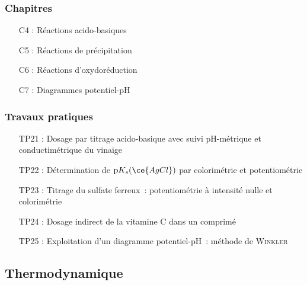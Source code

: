 \documentclass[a4paper, 10pt, final, garamond]{book}
\begin{document}
\begin{multicols}{2}
	\subsubsection{Chapitres}

	\begin{itemize}[label=$\diamond$]
		\item[C4]: Réactions acido-basiques
		\item[C5]: Réactions de précipitation
		\item[C6]: Réactions d'oxydoréduction
		\item[C7]: Diagrammes potentiel-pH
	\end{itemize}

	\columnbreak

	\subsubsection{Travaux pratiques}

	\begin{itemize}[label=$\diamond$]
		\item[TP21]: Dosage par titrage acido-basique avec suivi pH-métrique et
		conductimétrique du vinaige
		\item[TP22]: Détermination de $\mathrm{p}K_s(\ce{AgCl})$ par colorimétrie et
		potentiométrie
		\item[TP23]: Titrage du sulfate ferreux~: potentiométrie à intensité nulle et
		colorimétrie
		\item[TP24]: Dosage indirect de la vitamine C dans un comprimé
		\item[TP25]: Exploitation d'un diagramme potentiel-pH~: méthode de
		\textsc{Winkler}
	\end{itemize}
\end{multicols}

\subsection{Thermodynamique}
\end{document}
